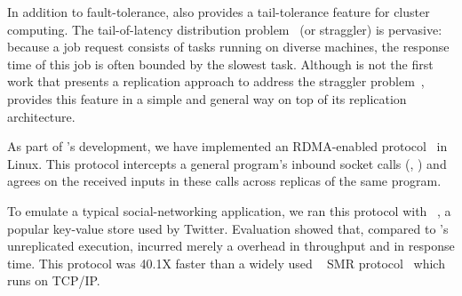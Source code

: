 


In addition to fault-tolerance, \xxx also provides a tail-tolerance 
feature for cluster computing. The tail-of-latency distribution 
problem~\cite{tail:cacm13} (or straggler) is pervasive: because a 
job request consists of tasks running on diverse machines, the response time of 
this job is often bounded by the slowest task. Although \xxx is not the first 
work that presents a replication approach to address the straggler 
problem~\cite{dolly:nsdi13}, \xxx provides this feature in a simple and general 
way on top of its \paxos replication architecture.


As part of \xxx's development, we have implemented an RDMA-enabled \paxos 
protocol~\cite{falcon:github} in Linux. This protocol intercepts a general 
program's inbound socket calls (\eg, \recv) and agrees on the received inputs 
in these calls across replicas of the same program.

To emulate a typical social-networking application, we ran this protocol with 
\redis~\cite{redis}, a popular key-value store used by Twitter. Evaluation 
showed that, compared to \redis's unreplicated execution, \xxx incurred merely a 
\tputoverhead overhead in throughput and \latencyoverhead in response time. 
This protocol was 40.1X faster than a widely used \zookeeper~\cite{zookeeper} 
SMR protocol~\cite{calvin:sigmod12} which runs on TCP/IP.

